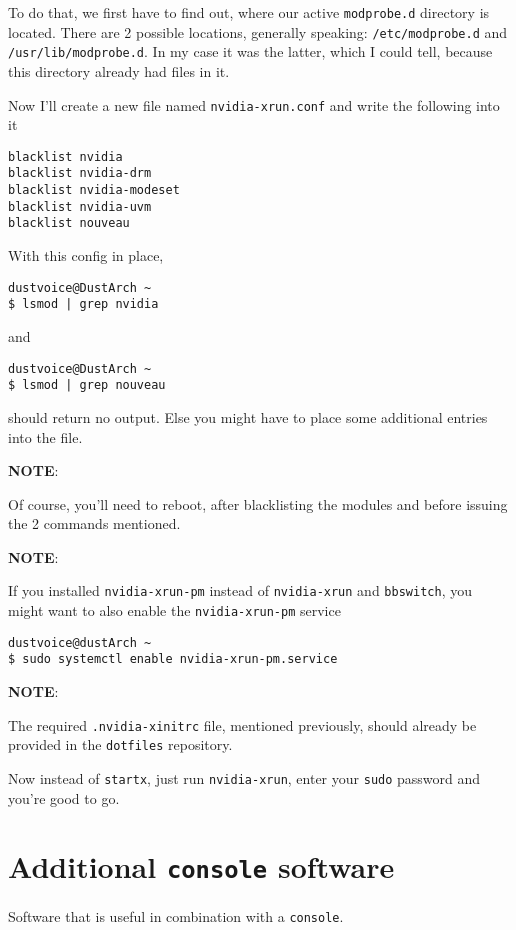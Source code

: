 \documentclass[9pt]{report}
\newcommand{\admonition}[2]{\textbf{#1}: {#2}}
\begin{document}
To do that, we first have to find out, where our active \texttt{modprobe.d} directory is located.
There are 2 possible locations, generally speaking: \texttt{/etc/modprobe.d} and \texttt{/usr/lib/modprobe.d}.
In my case it was the latter, which I could tell, because this directory already had files in it.


Now I’ll create a new file named \texttt{nvidia-xrun.conf} and write the following into it


\begin{verbatim}
blacklist nvidia
blacklist nvidia-drm
blacklist nvidia-modeset
blacklist nvidia-uvm
blacklist nouveau
\end{verbatim}

With this config in place,


\begin{verbatim}
dustvoice@DustArch ~
$ lsmod | grep nvidia
\end{verbatim}

and


\begin{verbatim}
dustvoice@DustArch ~
$ lsmod | grep nouveau
\end{verbatim}

should return no output.
Else you might have to place some additional entries into the file.


\admonition{NOTE}{Of course, you’ll need to reboot, after blacklisting the modules and before issuing the 2 commands mentioned.

}
\admonition{NOTE}{If you installed \texttt{nvidia-xrun-pm} instead of \texttt{nvidia-xrun} and \texttt{bbswitch}, you might want to also enable the \texttt{nvidia-xrun-pm} service


}
\begin{verbatim}
dustvoice@dustArch ~
$ sudo systemctl enable nvidia-xrun-pm.service
\end{verbatim}
\admonition{NOTE}{The required \texttt{.nvidia-xinitrc} file, mentioned previously, should already be provided in the \texttt{dotfiles} repository.

}
Now instead of \texttt{startx}, just run \texttt{nvidia-xrun}, enter your \texttt{sudo} password and you’re good to go.



\vfill\eject

\hypertarget{x-additional-console-software}{\section{Additional \texttt{console} software}}
Software that is useful in combination with a \texttt{console}.
\end{document}
